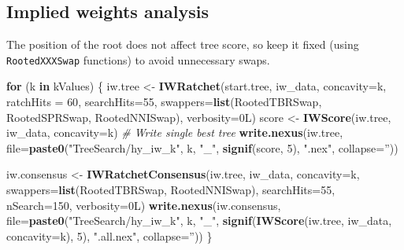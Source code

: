 \documentclass[openany]{book}
\newenvironment{Shaded}{\begin{snugshade}}{\end{snugshade}}
\newcommand{\KeywordTok}[1]{\textcolor[rgb]{0.13,0.29,0.53}{\textbf{#1}}}
\newcommand{\DataTypeTok}[1]{\textcolor[rgb]{0.13,0.29,0.53}{#1}}
\newcommand{\DecValTok}[1]{\textcolor[rgb]{0.00,0.00,0.81}{#1}}
\newcommand{\StringTok}[1]{\textcolor[rgb]{0.31,0.60,0.02}{#1}}
\newcommand{\CommentTok}[1]{\textcolor[rgb]{0.56,0.35,0.01}{\textit{#1}}}
\newcommand{\ControlFlowTok}[1]{\textcolor[rgb]{0.13,0.29,0.53}{\textbf{#1}}}
\newcommand{\NormalTok}[1]{#1}
\theoremstyle{definition}
\theoremstyle{definition}
\theoremstyle{definition}
\theoremstyle{remark}
\begin{document}
\hypertarget{implied-weights-analysis}{%
\subsection{Implied weights analysis}\label{implied-weights-analysis}}

The position of the root does not affect tree score, so keep it fixed
(using \texttt{RootedXXXSwap} functions) to avoid unnecessary swaps.

\begin{Shaded}
\begin{Highlighting}[]
\ControlFlowTok{for}\NormalTok{ (k }\ControlFlowTok{in}\NormalTok{ kValues) \{}
\NormalTok{  iw.tree <-}\StringTok{ }\KeywordTok{IWRatchet}\NormalTok{(start.tree, iw_data, }\DataTypeTok{concavity=}\NormalTok{k,}
                       \DataTypeTok{ratchHits =} \DecValTok{60}\NormalTok{, }\DataTypeTok{searchHits=}\DecValTok{55}\NormalTok{,}
                       \DataTypeTok{swappers=}\KeywordTok{list}\NormalTok{(RootedTBRSwap, RootedSPRSwap, RootedNNISwap),}
                       \DataTypeTok{verbosity=}\NormalTok{0L)}
\NormalTok{  score <-}\StringTok{ }\KeywordTok{IWScore}\NormalTok{(iw.tree, iw_data, }\DataTypeTok{concavity=}\NormalTok{k)}
  \CommentTok{# Write single best tree}
  \KeywordTok{write.nexus}\NormalTok{(iw.tree,}
              \DataTypeTok{file=}\KeywordTok{paste0}\NormalTok{(}\StringTok{"TreeSearch/hy_iw_k"}\NormalTok{, k, }\StringTok{"_"}\NormalTok{, }
                          \KeywordTok{signif}\NormalTok{(score, }\DecValTok{5}\NormalTok{), }\StringTok{".nex"}\NormalTok{, }\DataTypeTok{collapse=}\StringTok{''}\NormalTok{))}

\NormalTok{  iw.consensus <-}\StringTok{ }\KeywordTok{IWRatchetConsensus}\NormalTok{(iw.tree, iw_data, }\DataTypeTok{concavity=}\NormalTok{k,}
                  \DataTypeTok{swappers=}\KeywordTok{list}\NormalTok{(RootedTBRSwap, RootedNNISwap),}
                  \DataTypeTok{searchHits=}\DecValTok{55}\NormalTok{,}
                  \DataTypeTok{nSearch=}\DecValTok{150}\NormalTok{, }\DataTypeTok{verbosity=}\NormalTok{0L)}
  \KeywordTok{write.nexus}\NormalTok{(iw.consensus, }
              \DataTypeTok{file=}\KeywordTok{paste0}\NormalTok{(}\StringTok{"TreeSearch/hy_iw_k"}\NormalTok{, k, }\StringTok{"_"}\NormalTok{, }
                          \KeywordTok{signif}\NormalTok{(}\KeywordTok{IWScore}\NormalTok{(iw.tree, iw_data, }\DataTypeTok{concavity=}\NormalTok{k), }\DecValTok{5}\NormalTok{),}
                          \StringTok{".all.nex"}\NormalTok{, }\DataTypeTok{collapse=}\StringTok{''}\NormalTok{))}
\NormalTok{\}}
\end{Highlighting}
\end{Shaded}
\end{document}
